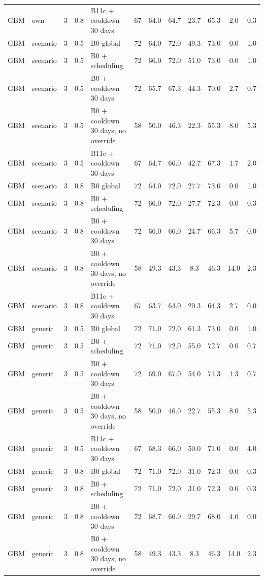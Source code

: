 \begin{longtable}{lllllccccccc}
GBM & own & 3 & 0.8 & B11c + cooldown 30 days & 67 & 64.0 & 64.7 & 23.7 & 65.3 & 2.0 & 0.3 \\
GBM & scenario & 3 & 0.5 & B0 global & 72 & 64.0 & 72.0 & 49.3 & 73.0 & 0.0 & 1.0 \\
GBM & scenario & 3 & 0.5 & B0 + scheduling & 72 & 66.0 & 72.0 & 51.0 & 73.0 & 0.0 & 1.0 \\
GBM & scenario & 3 & 0.5 & B0 + cooldown 30 days & 72 & 65.7 & 67.3 & 44.3 & 70.0 & 2.7 & 0.7 \\
GBM & scenario & 3 & 0.5 & B0 + cooldown 30 days, no override & 58 & 50.0 & 46.3 & 22.3 & 55.3 & 8.0 & 5.3 \\
GBM & scenario & 3 & 0.5 & B11c + cooldown 30 days & 67 & 64.7 & 66.0 & 42.7 & 67.3 & 1.7 & 2.0 \\
GBM & scenario & 3 & 0.8 & B0 global & 72 & 64.0 & 72.0 & 27.7 & 73.0 & 0.0 & 1.0 \\
GBM & scenario & 3 & 0.8 & B0 + scheduling & 72 & 66.0 & 72.0 & 27.7 & 72.3 & 0.0 & 0.3 \\
GBM & scenario & 3 & 0.8 & B0 + cooldown 30 days & 72 & 66.0 & 66.0 & 24.7 & 66.3 & 5.7 & 0.0 \\
GBM & scenario & 3 & 0.8 & B0 + cooldown 30 days, no override & 58 & 49.3 & 43.3 & 8.3 & 46.3 & 14.0 & 2.3 \\
GBM & scenario & 3 & 0.8 & B11c + cooldown 30 days & 67 & 63.7 & 64.0 & 20.3 & 64.3 & 2.7 & 0.0 \\
GBM & generic & 3 & 0.5 & B0 global & 72 & 71.0 & 72.0 & 61.3 & 73.0 & 0.0 & 1.0 \\
GBM & generic & 3 & 0.5 & B0 + scheduling & 72 & 71.0 & 72.0 & 55.0 & 72.7 & 0.0 & 0.7 \\
GBM & generic & 3 & 0.5 & B0 + cooldown 30 days & 72 & 69.0 & 67.0 & 54.0 & 71.3 & 1.3 & 0.7 \\
GBM & generic & 3 & 0.5 & B0 + cooldown 30 days, no override & 58 & 50.0 & 46.0 & 22.7 & 55.3 & 8.0 & 5.3 \\
GBM & generic & 3 & 0.5 & B11c + cooldown 30 days & 67 & 68.3 & 66.0 & 50.0 & 71.0 & 0.0 & 4.0 \\
GBM & generic & 3 & 0.8 & B0 global & 72 & 71.0 & 72.0 & 31.0 & 72.3 & 0.0 & 0.3 \\
GBM & generic & 3 & 0.8 & B0 + scheduling & 72 & 71.0 & 72.0 & 31.0 & 72.3 & 0.0 & 0.3 \\
GBM & generic & 3 & 0.8 & B0 + cooldown 30 days & 72 & 68.7 & 66.0 & 29.7 & 68.0 & 4.0 & 0.0 \\
GBM & generic & 3 & 0.8 & B0 + cooldown 30 days, no override & 58 & 49.3 & 43.3 & 8.3 & 46.3 & 14.0 & 2.3 \\

\end{longtable}
